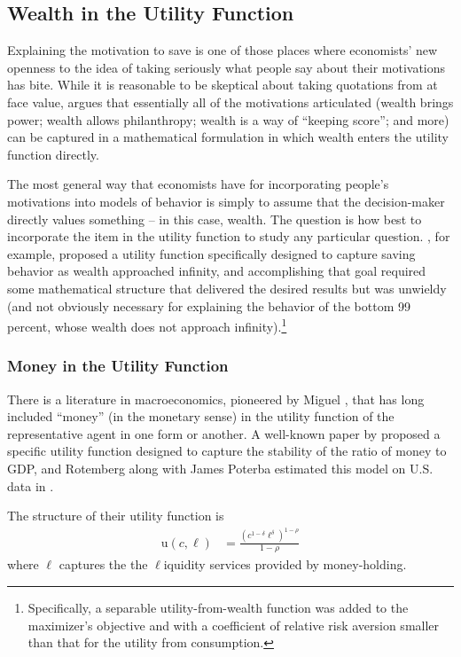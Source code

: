 \documentclass{article}
\newcommand{\CRRA}{\rho}
\newcommand{\uFunc}{\mathrm{u}}
\newcommand{\cNrm}{c}
\newcommand{\lqdt}{\ell}
\begin{document}
\bigskip\subsection{Wealth in the Utility Function}

Explaining the motivation to save is one of those places where economists' new openness to the idea of taking seriously what people say about their motivations has bite.
While it is reasonable to be skeptical about taking quotations from \cite{jaherGilded} at face value, \cite{WhyDoTheRich} argues that essentially all of the motivations articulated (wealth brings power; wealth allows philanthropy; wealth is a way of ``keeping score''; and more) can be captured in a mathematical formulation in which wealth enters the utility function directly.

The most general way that economists have for incorporating people's motivations into models of behavior is simply to assume that the decision-maker directly values something -- in this case, wealth.
The question is how best to incorporate the item in the utility function to study any particular question.
\cite{WhyDoTheRich}, for example, proposed a utility function specifically designed to capture saving behavior as wealth approached infinity, and accomplishing that goal required some mathematical structure that delivered the desired results but was unwieldy (and not obviously necessary for explaining the behavior of the bottom 99 percent, whose wealth does not approach infinity).\footnote{Specifically, a separable utility-from-wealth function was added to the maximizer's objective and with a coefficient of relative risk aversion smaller than that for the utility from consumption.}

\subsubsection{Money in the Utility Function}

There is a literature in macroeconomics, pioneered by Miguel \cite{sidrauski1967rational}, that has long included ``money'' (in the monetary sense) in the utility function of the representative agent in one form or another.
A well-known paper by \cite{Rotemberg1984} proposed a specific utility function designed to capture the stability of the ratio of money to GDP, and Rotemberg along with James Poterba estimated this model on U.S. data in \cite{Poterba_1986}.

The structure of their utility function is
\begin{align}
    \uFunc(\cNrm,\lqdt) & = \frac{\left(
        \cNrm^{1-\delta}\lqdt^{\delta}
        \right)^{1-\CRRA}}{1-\CRRA}
\end{align}
where $\lqdt$ captures the the $\lqdt$iquidity services provided by money-holding.
\end{document}
